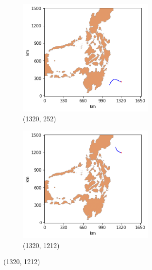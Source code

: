 \documentclass[11pt, english]{article}
\begin{document}
\begin{multicols}{2}
\begin{figure}
	\begin{subfigure}{0.48\textwidth}
		\centering
		\caption{(1320, 252)}
		\label{fig:test-simulations-3}
		\includegraphics[width=0.75\textwidth]{test-simulations-3}
	\end{subfigure}\hfill
	\begin{subfigure}{0.48\textwidth}
		\centering
		\caption{(1320, 1212)}
		\label{fig:test-simulations-4}
		\includegraphics[width=0.75\textwidth]{test-simulations-4}
	\end{subfigure}
\end{figure}


\end{multicols}
\end{document}
